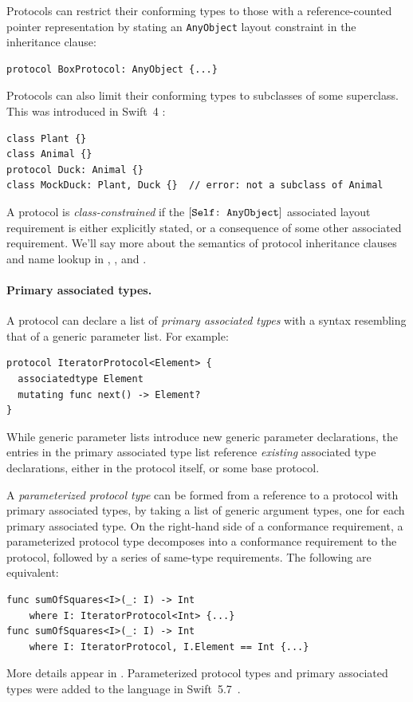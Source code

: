\documentclass[../generics]{subfiles}
\begin{document}
Protocols can restrict their conforming types to those with a reference-counted pointer representation by stating an \texttt{AnyObject} layout constraint in the inheritance clause:
\begin{Verbatim}
protocol BoxProtocol: AnyObject {...}
\end{Verbatim}

Protocols can also limit their conforming types to subclasses of some superclass. This was introduced in Swift~4 \cite{se0156}:
\begin{Verbatim}
class Plant {}
class Animal {}
protocol Duck: Animal {}
class MockDuck: Plant, Duck {}  // error: not a subclass of Animal
\end{Verbatim}
A protocol is \emph{class-constrained} if the $[\texttt{Self:~AnyObject}]$ associated layout requirement is either explicitly stated, or a consequence of some other associated requirement. We'll say more about the semantics of protocol inheritance clauses and name lookup in , , and .

\paragraph{Primary associated types.}
A protocol can declare a list of \emph{primary associated types} with a syntax resembling that of a generic parameter list. For example:
\begin{Verbatim}
protocol IteratorProtocol<Element> {
  associatedtype Element
  mutating func next() -> Element?
}
\end{Verbatim}
While generic parameter lists introduce new generic parameter declarations, the entries in the primary associated type list reference \emph{existing} associated type declarations, either in the protocol itself, or some base protocol.

A \emph{parameterized protocol type} can be formed from a reference to a protocol with primary associated types, by taking a list of generic argument types, one for each primary associated type. On the right-hand side of a conformance requirement, a parameterized protocol type decomposes into a conformance requirement to the protocol, followed by a series of same-type requirements. The following are equivalent:
\begin{Verbatim}
func sumOfSquares<I>(_: I) -> Int
    where I: IteratorProtocol<Int> {...}
func sumOfSquares<I>(_: I) -> Int
    where I: IteratorProtocol, I.Element == Int {...}
\end{Verbatim}
More details appear in . Parameterized protocol types and primary associated types were added to the language in Swift~5.7~\cite{se0346}.
\end{document}
